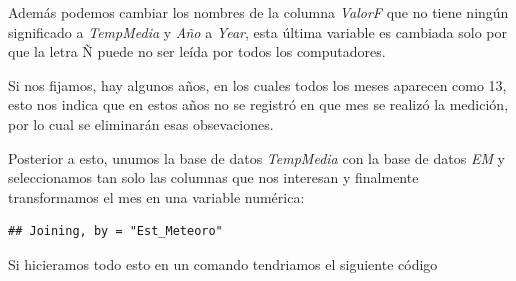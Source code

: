 \documentclass[]{book}
\newenvironment{Shaded}{\begin{snugshade}}{\end{snugshade}}
\newcommand{\DataTypeTok}[1]{\textcolor[rgb]{0.13,0.29,0.53}{#1}}
\newcommand{\DecValTok}[1]{\textcolor[rgb]{0.00,0.00,0.81}{#1}}
\newcommand{\KeywordTok}[1]{\textcolor[rgb]{0.13,0.29,0.53}{\textbf{#1}}}
\newcommand{\NormalTok}[1]{#1}
\newcommand{\OperatorTok}[1]{\textcolor[rgb]{0.81,0.36,0.00}{\textbf{#1}}}
\newcommand{\StringTok}[1]{\textcolor[rgb]{0.31,0.60,0.02}{#1}}
\begin{document}
Además podemos cambiar los nombres de la columna \emph{ValorF} que no
tiene ningún significado a \emph{TempMedia} y \emph{Año} a \emph{Year},
esta última variable es cambiada solo por que la letra Ñ puede no ser
leída por todos los computadores.

\begin{Shaded}
\end{Shaded}

Si nos fijamos, hay algunos años, en los cuales todos los meses aparecen
como 13, esto nos indica que en estos años no se registró en que mes se
realizó la medición, por lo cual se eliminarán esas obsevaciones.

\begin{Shaded}
\end{Shaded}

Posterior a esto, unumos la base de datos \emph{TempMedia} con la base
de datos \emph{EM} y seleccionamos tan solo las columnas que nos
interesan y finalmente transformamos el mes en una variable numérica:

\begin{verbatim}
## Joining, by = "Est_Meteoro"
\end{verbatim}

\begin{Shaded}
\end{Shaded}

Si hicieramos todo esto en un comando tendriamos el siguiente código
\end{document}

